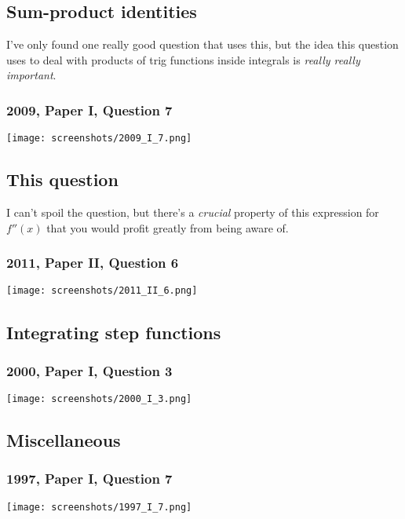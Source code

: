 \documentclass[a4paper,12pt]{article}
\begin{document}
\subsection{Sum-product identities}

I've only found one really good question that uses this, but the idea this
question uses to deal with products of trig functions inside integrals is
\emph{really really important}.

\subsubsection{2009, Paper I, Question 7}
\begin{center}
 \texttt{[image: screenshots/2009\_I\_7.png]}
\end{center}

\subsection{This question}

I can't spoil the question, but there's a \emph{crucial} property of this
expression for \(f''(x)\) that you would profit greatly from being aware of.

\subsubsection{2011, Paper II, Question 6}
\begin{center}
 \texttt{[image: screenshots/2011\_II\_6.png]}
\end{center}

\subsection{Integrating step functions}

\subsubsection{2000, Paper I, Question 3}
\begin{center}
 \texttt{[image: screenshots/2000\_I\_3.png]}
\end{center}

\subsection{Miscellaneous}

\subsubsection{1997, Paper I, Question 7}
\begin{center}
 \texttt{[image: screenshots/1997\_I\_7.png]}
\end{center}
\end{document}
